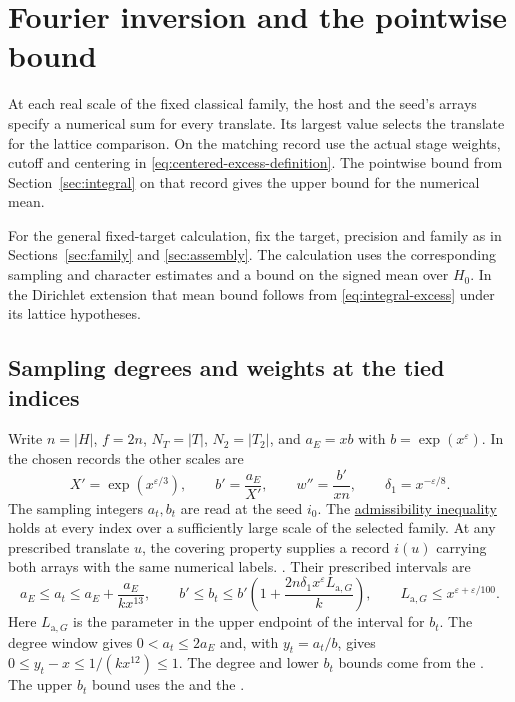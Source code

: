 \section{Fourier inversion and the pointwise bound}
\label{sec:fourier}

At each real scale of the fixed classical family, the host and the
seed's arrays specify a numerical sum for every translate. Its largest
value selects the translate for the lattice comparison. On the matching
record use the actual stage weights, cutoff and centering in
\eqref{eq:centered-excess-definition}. The pointwise bound from
Section~\ref{sec:integral} on that record gives the upper bound for the
numerical mean.

For the general fixed-target calculation, fix the target, precision
and family as in Sections~\ref{sec:family} and \ref{sec:assembly}.
The calculation uses the corresponding sampling and character
estimates and a bound on the signed mean over \(H_0\). In the
Dirichlet extension that mean bound follows from
\eqref{eq:integral-excess} under its lattice hypotheses.

\subsection{Sampling degrees and weights at the tied indices}
\label{sec:fourier-sampling}

Write \(n=|H|\), \(f=2n\), \(N_T=|T|\), \(N_2=|T_2|\), and
\(a_E=xb\) with \(b=\exp(x^\varepsilon)\). In the chosen records the
other scales are
\[
 X'=\exp(x^{\varepsilon/3}),\qquad b'=\frac{a_E}{X'},\qquad
 w''=\frac{b'}{xn},\qquad \delta_1=x^{-\varepsilon/8}.
\]
The sampling integers \(a_t,b_t\) are read at the seed \(i_0\). The
\hyperlink{proof.selection-realized-samples}{admissibility inequality}
holds at every index over a sufficiently large scale of the selected family.
At any prescribed translate \(u\), the covering property supplies a
record \(i(u)\) carrying both arrays with the same numerical labels.
.
Their prescribed intervals are
\[
 a_E\le a_t\le a_E+\frac{a_E}{kx^{13}},\qquad
 b'\le b_t\le b'\left(1+\frac{2n\delta_1x^\varepsilon L_{\mathrm{a},G}}{k}\right),
 \qquad L_{\mathrm{a},G}\le x^{\varepsilon+\varepsilon/100}.
\]
Here \(L_{\mathrm{a},G}\) is the parameter in the upper endpoint of the
interval for \(b_t\). The degree window gives \(0<a_t\le2a_E\) and,
with \(y_t=a_t/b\), gives \(0\le y_t-x\le 1/(kx^{12})\le1\).
The degree and lower \(b_t\) bounds come from the
.
The upper \(b_t\) bound uses the
and the
.

